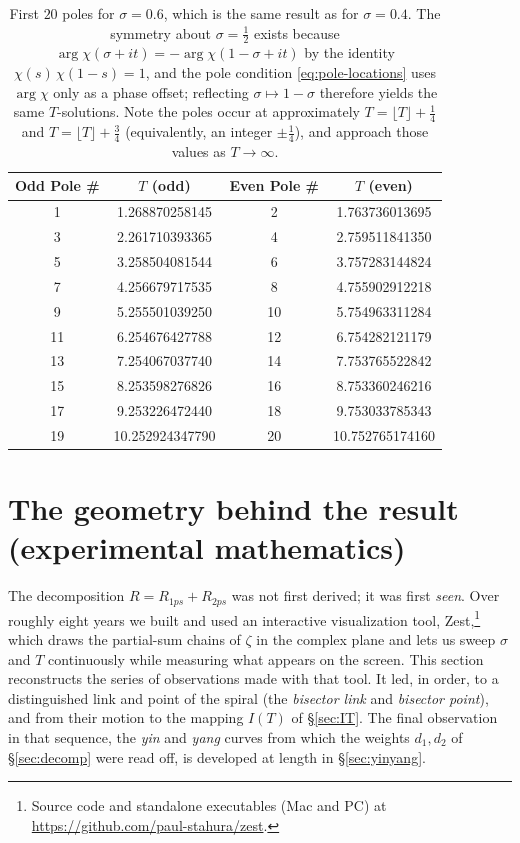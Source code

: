 \documentclass[11pt]{article}
\theoremstyle{definition}
\begin{document}
\begin{table}[h!]
\centering
\begin{tabular}{|c|c|c|c|}
\hline
\textbf{Odd Pole \#} & \textbf{$T$ (odd)} & \textbf{Even Pole \#} & \textbf{$T$ (even)} \\ \hline
1  & 1.268870258145  & 2  & 1.763736013695 \\
3  & 2.261710393365  & 4  & 2.759511841350 \\
5  & 3.258504081544  & 6  & 3.757283144824 \\
7  & 4.256679717535  & 8  & 4.755902912218 \\
9  & 5.255501039250  & 10 & 5.754963311284 \\
11 & 6.254676427788  & 12 & 6.754282121179 \\
13 & 7.254067037740  & 14 & 7.753765522842 \\
15 & 8.253598276826  & 16 & 8.753360246216 \\
17 & 9.253226472440  & 18 & 9.753033785343 \\
19 & 10.252924347790 & 20 & 10.752765174160 \\
\hline
\end{tabular}
\caption{First $20$ poles for $\sigma=0.6$, which is the same result as
for $\sigma=0.4$. The symmetry about $\sigma=\tfrac12$ exists because
$\arg\chi(\sigma+it)=-\arg\chi(1-\sigma+it)$ by the identity
$\chi(s)\,\chi(1-s)=1$, and the pole condition
\eqref{eq:pole-locations} uses $\arg\chi$ only as a phase offset;
reflecting $\sigma\mapsto1-\sigma$ therefore yields the same
$T$-solutions. Note the poles occur at approximately
$T=\lfloor T\rfloor+\tfrac14$ and $T=\lfloor T\rfloor+\tfrac34$
(equivalently, an integer $\pm\tfrac14$), and approach those values as
$T\to\infty$.}
\label{tab:poles}
\end{table}

\clearpage
\section{The geometry behind the result (experimental mathematics)}\label{sec:geometry}

The decomposition $R=R_{1ps}+R_{2ps}$ was not first derived; it was first
\emph{seen}. Over roughly eight years we built and used an interactive
visualization tool, Zest,\footnote{Source code and standalone executables (Mac
and PC) at \url{https://github.com/paul-stahura/zest}.} which draws the
partial-sum chains of $\zeta$ in the complex plane and lets us sweep $\sigma$
and $T$ continuously while measuring what appears on the screen. This section
reconstructs the series of observations made with that tool. It led, in order,
to a distinguished link and point of the spiral (the \emph{bisector link} and
\emph{bisector point}), and from their motion to the mapping $I(T)$ of
\S\ref{sec:IT}. The final observation in that sequence, the \emph{yin} and
\emph{yang} curves from which the weights $d_1,d_2$ of \S\ref{sec:decomp}
were read off, is developed at length in \S\ref{sec:yinyang}.
\end{document}
